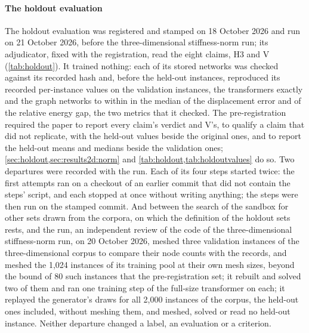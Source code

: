 \paragraph{The holdout evaluation}
The holdout evaluation was registered and stamped on 18 October 2026 and run on 21 October
2026, before the three-dimensional stiffness-norm run; its adjudicator, fixed with the
registration, read the eight claims, H3 and V (\cref{tab:holdout}). It trained nothing: each
of its \numHoldStates{} stored networks was checked against its recorded hash and, before
the held-out instances, reproduced its recorded per-instance values on the validation
instances, the transformers exactly and the graph networks to within \numHoldContentDev{} in
the median of the displacement error and of the relative energy gap, the two metrics that it
checked. The pre-registration required the paper to report every claim's verdict and V's, to
qualify a claim that did not replicate, with the held-out values beside the original ones,
and to report the held-out means and medians beside the validation ones;
\cref{sec:holdout,sec:results2d:norm} and \cref{tab:holdout,tab:holdoutvalues} do so. Two
departures were recorded with the run. Each of its four steps started twice: the first
attempts ran on a checkout of an earlier commit that did not contain the steps' script, and
each stopped at once without writing anything; the steps were then run on the stamped
commit. And between the search of the sandbox for other sets drawn from the corpora, on
which the definition of the holdout sets rests, and the run, an independent review of the
code of the three-dimensional stiffness-norm run, on 20 October 2026, meshed three
validation instances of the three-dimensional corpus to compare their node counts with the
records, and meshed the 1,024 instances of its training pool at their own mesh sizes, beyond
the bound of 80 such instances that the pre-registration set; it rebuilt and solved two of
them and ran one training step of the full-size transformer on each; it replayed the
generator's draws for all 2,000 instances of the corpus, the held-out ones included, without
meshing them, and meshed, solved or read no held-out instance. Neither departure changed a
label, an evaluation or a criterion.



